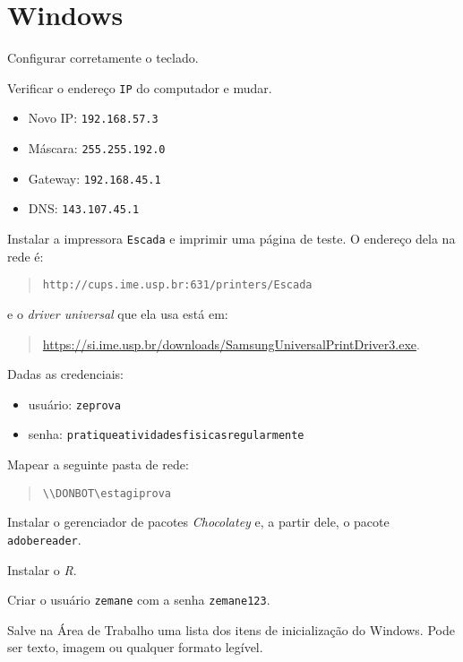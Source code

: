 \section*{Windows}
\begin{questions}

\question
Configurar corretamente o teclado.

\question
Verificar o endereço \verb+IP+ do computador e mudar.
\begin{itemize}
    \item Novo IP: \verb+192.168.57.3+
    \item Máscara: \verb+255.255.192.0+
    \item Gateway: \verb+192.168.45.1+
    \item DNS: \verb+143.107.45.1+
\end{itemize}

\question
Instalar a impressora \verb+Escada+ e imprimir uma página de teste. O
endereço dela na rede é:

\begin{quote}
\verb+http://cups.ime.usp.br:631/printers/Escada+
\end{quote}

e o \textit{driver universal} que ela usa está em:
\begin{quote}
    \url{https://si.ime.usp.br/downloads/SamsungUniversalPrintDriver3.exe}.
\end{quote}

\question
Dadas as credenciais:
\begin{itemize}
\item usuário: \verb+zeprova+
\item senha: \verb+pratiqueatividadesfisicasregularmente+
\end{itemize}

Mapear a seguinte pasta de rede:
\begin{quotation}
    \verb+\\DONBOT\estagiprova+
\end{quotation}

\question
Instalar o gerenciador de pacotes \textit{Chocolatey} e, a partir dele, o pacote \verb+adobereader+.

\question
Instalar o \textit{R}.

\question
Criar o usuário \verb+zemane+ com a senha \verb+zemane123+.

\question
Salve na Área de Trabalho uma lista dos itens de inicialização do Windows. Pode ser texto, imagem ou qualquer formato legível.

\end{questions}
\newpage


